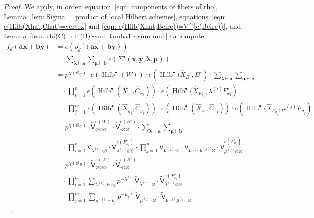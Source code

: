 \documentclass[12pt]{amsart}
\theoremstyle{definition}
\renewcommand{\O}{\mathcal{O}}
\newcommand{\sfVtilde}{\widetilde{\mathsf{V}}}
\newcommand{\Hilb}{\operatorname{Hilb}}
\newcommand{\boldx}{\boldsymbol{x}}
\newcommand{\boldy}{\boldsymbol{y}}
\newcommand{\bolda}{\boldsymbol{a}}
\newcommand{\boldb}{\boldsymbol{b}}
\newcommand{\boldlambda}{\boldsymbol{\lambda }}
\newcommand{\boldmu}{\boldsymbol{\mu }}
\newcommand{\Sigmaxylambdamu}{\Sigma^{\bullet }(\boldx ,\boldy ,\boldlambda ,\boldmu )}
\renewcommand{\emptyset}{\varnothing}
\renewcommand{\hat}{\widehat}
\newcommand{\Xhat}{\widehat{X}}
\newcommand{\bx}{\square}
\newcommand{\mujprime}{\mu^{(j)\prime}}
\begin{document}
\begin{proof}
We apply, in order, equation~\eqref{eqn: components of fibers of rho},
Lemma~\ref{lem: Sigma = product of local Hilbert schemes},
equations~\eqref{eqn: e(Hilb(Xhat,Chat)=vertex} and \eqref{eqn:
e(Hilb(Xhat,Bcirc))=V^{e(Bcirc)}}, and Lemma~\ref{lem: chi(C)=chi(B)
-sum lamba1 - sum mu1} to compute
\begin{align*}
f_{d}(\bolda \boldx +\boldb \boldy )&= e\left(\rho_{d}^{-1}(\bolda
\boldx +\boldb \boldy) \right) \\
&= \sum_{\boldlambda \vdash \bolda}\sum_{\boldmu \vdash \boldb} e\left(\Sigmaxylambdamu \right)\\
&=p^{\chi (\O_{C})} \cdot e(\Hilb^{\bullet}(W)) \cdot
e\left(\Hilb^{\bullet}(\Xhat_{B^{\circ}},B^{\circ} \right) \cdot
\sum_{\boldlambda \vdash \bolda}\sum_{\boldmu
\vdash \boldb}\\
& \quad  \cdot \prod_{i=1}^{n}
e\left(\Hilb^{\bullet}(\Xhat_{x_{i}},\hat{C}_{x_{i}}) \right) \cdot
e\left(\Hilb^{\bullet}(\Xhat_{F^{\circ}_{x_{i}}},\lambda^{(i)}F^{\circ}_{x_{i}}
\right) \\
& \quad  \cdot   \prod_{j=1}^{m}
e\left(\Hilb^{\bullet}(\Xhat_{y_{j}},\hat{C}_{y_{j}}) \right) \cdot
e\left(\Hilb^{\bullet}(\Xhat_{z_{j}},\hat{C}_{z_{j}}) \right) \cdot
e\left(\Hilb^{\bullet}(\Xhat_{F^{\circ}_{y_{j}}},\mu^{(j)}F^{\circ}_{y_{j}}
\right)\\
&=p^{\chi (\O_{C})}\cdot \sfVtilde_{\emptyset \emptyset
\emptyset}^{e(W)} \cdot \sfVtilde^{e(B^{\circ})}_{\bx \emptyset
\emptyset} \cdot  \sum_{\boldlambda \vdash \bolda}\sum_{\boldmu
\vdash \boldb}\\
& \quad \cdot \prod_{i=1}^{n} \sfVtilde_{\lambda^{(i)}\bx \emptyset}
\cdot \sfVtilde^{e(F^{\circ}_{x_{i}})}_{\lambda^{(i)}\emptyset
\emptyset} \cdot \prod_{j=1}^{m} \sfVtilde_{\mu^{(j)}\bx \emptyset}
\cdot \sfVtilde_{\mu^{(j)} \mujprime \emptyset }\cdot
\sfVtilde^{e(F^{\circ}_{y_{j}})}_{\mu^{(j)}\emptyset \emptyset} \\
&=p^{\chi (\O_{B})}\cdot \sfVtilde_{\emptyset \emptyset
\emptyset}^{e(W)} \cdot \sfVtilde^{e(B^{\circ})}_{\bx \emptyset
\emptyset}\\
&\quad \cdot \prod_{i=1}^{n} \sum_{\lambda^{(i)}\vdash a_{i}}
p^{-\lambda_{1}^{(i)}} \sfVtilde_{\lambda^{(i)}\bx \emptyset} \cdot
\sfVtilde^{e(F^{\circ}_{x_{i}})}_{\lambda^{(i)}\emptyset \emptyset}\\
&\quad \cdot \prod_{j=1}^{m} \sum_{\mu^{(j)}\vdash b_{j}}
p^{-\mu_{1}^{(j)}} \sfVtilde_{\mu^{(j)} \bx \emptyset} \cdot
\sfVtilde_{\mu^{(j)} \mujprime \emptyset }\cdot

\end{align*}
\end{proof}
\end{document}
